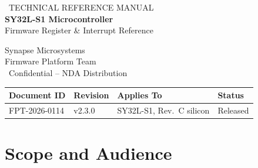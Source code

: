 \documentclass[11pt,a4paper,parskip=half]{scrartcl}
\begin{document}

\vspace*{-1.55cm}
\begin{minipage}{0.68\textwidth}
  \color{white}\sffamily
  {\fontsize{11}{13}\selectfont \faFile\ TECHNICAL REFERENCE MANUAL}\\[6pt]
  {\fontsize{22}{26}\selectfont\bfseries SY32L-S1 Microcontroller}\\[2pt]
  {\fontsize{15}{18}\selectfont Firmware Register \& Interrupt Reference}
\end{minipage}
\hfill
\begin{minipage}{0.27\textwidth}
  \raggedleft\color{white}\sffamily\small
  Synapse Microsystems\\
  Firmware Platform Team\\[4pt]
  \faLock\ Confidential -- NDA Distribution
\end{minipage}

\vspace{0.9cm}

\begin{center}
\begin{tabularx}{\textwidth}{|Y|Y|Y|Y|}
\hline
{}
\textbf{\small Document ID} & \textbf{\small Revision} & \textbf{\small Applies To} & \textbf{\small Status} \\
\hline
\small FPT-2026-0114 & \small v2.3.0 & \small SY32L-S1, Rev.\ C silicon & \small Released \\
\hline
\end{tabularx}
\end{center}

\vspace{0.4cm}

\section*{Scope and Audience}
\end{document}
